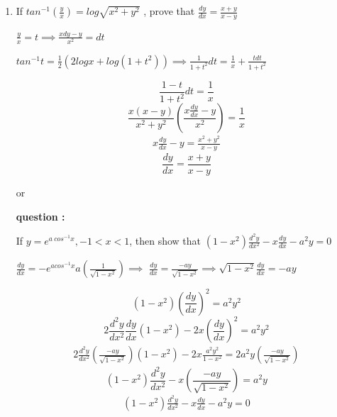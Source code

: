 \begin{enumerate}[label=\thesubsection.\arabic*, ref=\thesubsection.\theenumi]
\solution

normal vector of plane 1 i.e, $(2,-1,1)$ lies on plane 2

dr be the normal vector of plane 2

$$dr_1 = \begin{pmatrix} 2 \\ -1\\2\end{pmatrix}; dr_2= \begin{pmatrix} 2\\-1\\1 \end{pmatrix} $$  $$dr=dr_1 \times {dr_2 } \implies \begin{pmatrix}1\\2\\0\end{pmatrix}$$

$1(x-1) +2(y)+0(z+2) =0 \implies x+2y=1$

\item 

If $tan^{-1}(\frac{y}{x})=log\sqrt{x^{2}+y^{2}}$ , prove that $\frac{dy}{dx}=\frac{x+y}{x-y}$

\solution

$\frac{y}{x}=t \implies \frac{xdy-y}{x^2} =dt$

$tan^{-1}t=\frac{1}{2}(2logx +log(1+t^2)) \implies \frac{1}{1+ t^2}dt= \frac{1}{x}+\frac{tdt}{1+t^2}$

$$\frac{1-t}{1+t^2}dt =\frac{1}{x}$$  $$\frac{x(x-y)}{x^2+y^2}\left(\frac{x\frac{dy}{dx}-y}{x^2}\right)=\frac{1}{x}$$
\begin{align}
	x\frac{dy}{dx}-y=\frac{x^2+y^2}{x-y}
\end{align}
$$\frac{dy}{dx}= \frac{x+y}{x-y}$$

\begin{center}
    or 
\end{center}
\textbf{question :}

If $y=e^{a~cos^{-1}x},-1<x<1$, then show that $(1-x^{2})\frac{d^{2}y}{dx^{2}}-x\frac{dy}{dx}-a^{2}y=0$

\solution

$\frac{dy}{dx}=-e^{a cos^{-1}x}a(\frac{1}{\sqrt{1-x^2}}) \implies$ $\frac{dy}{dx}= \frac{-ay}{\sqrt{1-x^2}} \implies \sqrt{1-x^2}\frac{dy}{dx}= -ay$


$$(1-x^2)(\frac{dy}{dx})^2=a^2y^2$$ 
$$2\frac{d^2y}{dx^2}\frac{dy}{dx}(1-x^2)-2x\left(\frac{dy}{dx}\right)^2=a^2y^2$$ \begin{align}
	2\frac{d^2y}{dx^2}(\frac{-ay}{\sqrt{1-x^2}})(1-x^2)-2x\frac{a^2y^2}{1-x^2}= 2a^2y(\frac{-ay}{\sqrt{1-x^2}}) \end{align}
$$ (1-x^2)\frac{d^2y}{dx^2}-x\left(\frac{-ay}{\sqrt{1-x^2}}\right)=a^2y$$
\begin{align}
	(1-x^{2})\frac{d^{2}y}{dx^{2}}-x\frac{dy}{dx}-a^{2}y=0
\end{align}


\end{enumerate}
